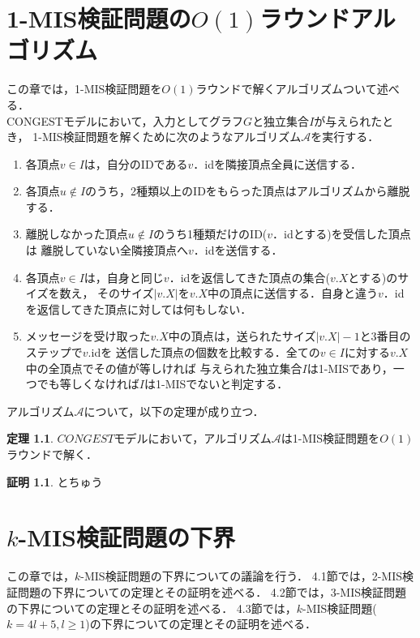 \documentclass[12pt]{thesis}
\newcommand{\CONGEST}{\textsf{CONGEST}}
\theoremstyle{definition}
\newtheorem{theorem}{定理}[chapter]
\newtheorem*{prf*}{証明}
\begin{document}
\chapter{1-MIS検証問題の$O(1)$ラウンドアルゴリズム}
この章では，1-MIS検証問題を$O(1)$ラウンドで解くアルゴリズムついて述べる． \\
{\CONGEST}モデルにおいて，入力としてグラフ$G$と独立集合$I$が与えられたとき，
1-MIS検証問題を解くために次のようなアルゴリズム$\mathcal{A}$を実行する．
\begin{enumerate}
\item 各頂点$v \in I$は，自分のIDである$v$．idを隣接頂点全員に送信する．
\item 各頂点$u \notin I$のうち，2種類以上のIDをもらった頂点はアルゴリズムから離脱する．
\item 離脱しなかった頂点$u \notin I$のうち1種類だけのID($v$．idとする)を受信した頂点は
離脱していない全隣接頂点へ$v$．idを送信する．
\item 各頂点$v \in I$は，自身と同じ$v$．idを返信してきた頂点の集合($v.X$とする)のサイズを数え，
そのサイズ$|v.X|$を$v.X$中の頂点に送信する．自身と違う$v$．idを返信してきた頂点に対しては何もしない．
\item メッセージを受け取った$v.X$中の頂点は，送られたサイズ$|v.X| - 1$と3番目のステップで$v$.idを
送信した頂点の個数を比較する．全ての$v \in I$に対する$v.X$中の全頂点でその値が等しければ
与えられた独立集合$I$は1-MISであり，一つでも等しくなければ$I$は1-MISでないと判定する．
\end{enumerate}
アルゴリズム$\mathcal{A}$について，以下の定理が成り立つ．
\begin{theorem}
$CONGEST$モデルにおいて，アルゴリズム$\mathcal{A}$は1-MIS検証問題を$O(1)$ラウンドで解く．
\end{theorem}
\begin{prf*}
とちゅう
\end{prf*}
\newpage

\chapter{$k$-MIS検証問題の下界}
この章では，$k$-MIS検証問題の下界についての議論を行う．
4.1節では，2-MIS検証問題の下界についての定理とその証明を述べる．
4.2節では，3-MIS検証問題の下界についての定理とその証明を述べる．
4.3節では，$k$-MIS検証問題($k = 4l + 5, l \geq 1$)の下界についての定理とその証明を述べる．
\end{document}
